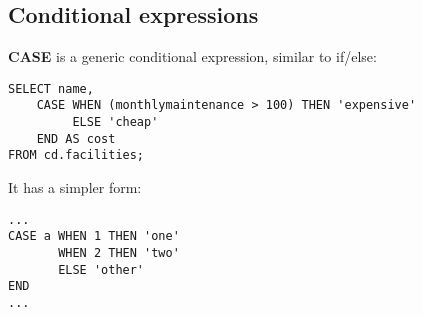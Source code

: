 %

\subsection{Conditional expressions}
\textbf{CASE} is a generic conditional expression, similar to if/else:
\begin{verbatim}
SELECT name,
    CASE WHEN (monthlymaintenance > 100) THEN 'expensive'
         ELSE 'cheap'
    END AS cost
FROM cd.facilities;
\end{verbatim}
It has a simpler form:
\begin{verbatim}
...
CASE a WHEN 1 THEN 'one'
       WHEN 2 THEN 'two'
       ELSE 'other'
END
...
\end{verbatim}

%